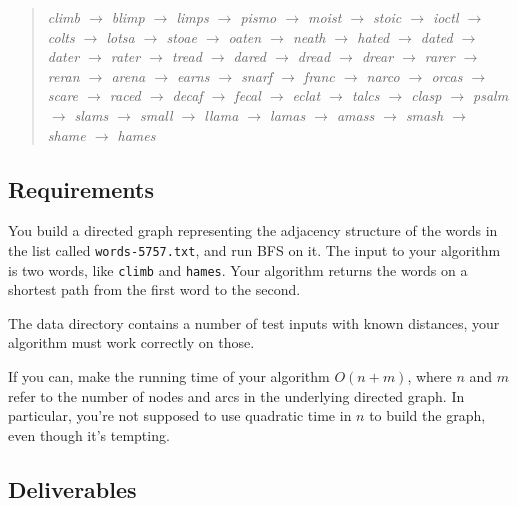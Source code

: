 \documentclass{tufte-handout}
\begin{document}
\begin{fullwidth}
\begin{quotation}\em
climb $\rightarrow$ blimp $\rightarrow$ limps $\rightarrow$ pismo $\rightarrow$ moist $\rightarrow$ stoic $\rightarrow$ ioctl $\rightarrow$ colts $\rightarrow$ lotsa $\rightarrow$ stoae $\rightarrow$ oaten $\rightarrow$ neath $\rightarrow$ hated $\rightarrow$ dated $\rightarrow$ dater $\rightarrow$ rater $\rightarrow$ tread $\rightarrow$ dared $\rightarrow$ dread $\rightarrow$ drear $\rightarrow$ rarer $\rightarrow$ reran $\rightarrow$ arena $\rightarrow$ earns $\rightarrow$ snarf $\rightarrow$ franc $\rightarrow$ narco $\rightarrow$ orcas $\rightarrow$ scare $\rightarrow$ raced $\rightarrow$ decaf $\rightarrow$ fecal $\rightarrow$ eclat $\rightarrow$ talcs $\rightarrow$ clasp $\rightarrow$ psalm $\rightarrow$ slams $\rightarrow$ small $\rightarrow$ llama $\rightarrow$ lamas $\rightarrow$ amass $\rightarrow$ smash $\rightarrow$ shame $\rightarrow$ hames
\end{quotation}
\end{fullwidth}

\subsection{Requirements}

You build a directed graph representing the adjacency structure of the words in the list called {\tt words-5757.txt}, and run BFS on it. 
The input to your algorithm is two words, like {\tt climb} and {\tt hames}.
Your algorithm returns the words on a shortest path from the first word to the second.

The data directory contains a number of test inputs with known distances, your algorithm must work correctly on those.

If you can, make the running time of your algorithm  $O(n+m)$, where $n$ and $m$ refer to the number of nodes and arcs in the underlying directed graph. 
In particular, you’re not supposed to use quadratic time in $n$ to build the graph, even though it’s tempting.

\subsection{Deliverables}
\end{document}
